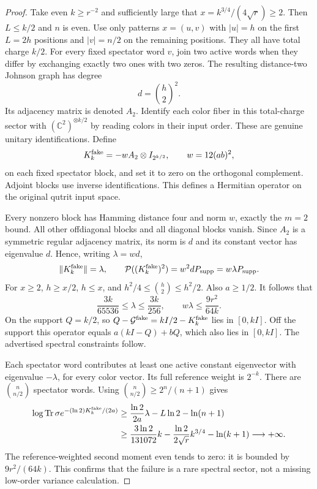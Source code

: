 \begin{proof}
Take even $k\ge r^{-2}$ and sufficiently large that
$x=k^{3/4}/(4\sqrt r)\ge2$. Then $L\le k/2$ and $n$ is even.
Use only patterns $x=(u,v)$ with $|u|=h$ on the first $L=2h$ positions
and $|v|=n/2$ on the remaining positions. They all have total charge
$k/2$. For every fixed spectator word $v$, join two active words when
they differ by exchanging exactly two ones with two zeros. The resulting
distance-two Johnson graph has degree
\[
 d=\binom h2^2.
\]
Its adjacency matrix is denoted $A_2$. Identify each color fiber in
this total-charge sector with $(\mathbb C^2)^{\otimes k/2}$ by reading
colors in their input order. These are genuine unitary identifications.
Define
\[
 K^{\rm fake}_k=-wA_2\otimes I_{2^{k/2}},\qquad
 w=12(ab)^2,
\]
on each fixed spectator block, and set it to zero on the orthogonal
complement. Adjoint blocks use inverse identifications. This defines a
Hermitian operator on the original qutrit input space.

Every nonzero block has Hamming distance four and norm $w$, exactly the
$m=2$ bound. All other offdiagonal blocks and all diagonal blocks vanish.
Since $A_2$ is a symmetric regular adjacency matrix, its norm is $d$ and
its constant vector has eigenvalue $d$. Hence, writing $\lambda=wd$,
\[
 \|K^{\rm fake}_k\|=\lambda,\qquad
 \mathcal P((K^{\rm fake}_k)^2)=w^2dP_{\rm supp}=w\lambda P_{\rm supp}.
\]
For $x\ge2$, $h\ge x/2$, $h\le x$, and
$h^2/4\le\binom h2\le h^2/2$. Also $a\ge1/2$. It follows that
\[
 \frac{3k}{65536}\le\lambda\le\frac{3k}{256},\qquad
 w\lambda\le\frac{9r^2}{64k}.
\]
On the support $Q=k/2$, so
$Q-\mathcal G^{\rm fake}=kI/2-K^{\rm fake}_k$ lies in $[0,kI]$.
Off the support this operator equals $a(kI-Q)+bQ$, which also lies in
$[0,kI]$. The advertised spectral constraints follow.

Each spectator word contributes at least one active constant eigenvector
with eigenvalue $-\lambda$, for every color vector. Its full reference
weight is $2^{-k}$. There are $\binom n{n/2}$ spectator words.
Using $\binom n{n/2}\ge2^n/(n+1)$ gives
\begin{align*}
 \log\operatorname{Tr}\sigma e^{-(\ln2)K^{\rm fake}_k/(2a)}
 &\ge\frac{\ln2}{2a}\lambda-L\ln2-\ln(n+1)\\
 &\ge\frac{3\ln2}{131072}k
   -\frac{\ln2}{2\sqrt r}k^{3/4}-\ln(k+1)
   \longrightarrow+\infty.
\end{align*}
The reference-weighted second moment even tends to zero: it is bounded
by $9r^2/(64k)$. This confirms that the failure is a rare spectral sector,
not a missing low-order variance calculation.
\end{proof}

